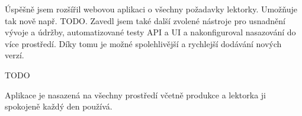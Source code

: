 Úspěšně jsem rozšířil webovou aplikaci o všechny požadavky lektorky. Umožňuje tak nově např. TODO. Zavedl jsem také další zvolené nástroje pro usnadnění vývoje a údržby, automatizované testy API a UI a nakonfiguroval nasazování do více prostředí. Díky tomu je možné spolehlivější a rychlejší dodávání nových verzí.

TODO

Aplikace je nasazená na všechny prostředí včetně produkce a lektorka ji spokojeně každý den používá. 


